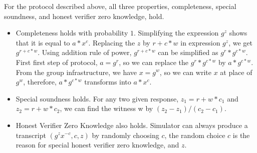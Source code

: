 \begin{enumerate}
{     For the protocol described above, all three properties, completeness, special soundness, and honest 
     verifier zero knowledge, hold. 
     \begin{itemize}
      \item Completeness holds with probability $1$. Simplifying the expression $g^{z}$ shows that 
      it is equal to $a * x^{c}$. Replacing the $z$ by $r + c * w$ in expression  $g^{z}$, we get 
      $g^{r + c * w}$.  Using addition rule of power, $g^{r + c * w}$ can be simplified as 
      $g^{r} * g^{c * w}$. First first step of protocol, $a = g^r$, so we can replace the $g^{r} * g^{c * w}$ 
      by $a * g^{c * w}$. From the group infrastructure, we have $x = g^w$, so we can write $x$ at place of 
      $g^{w}$, therefore, $a * g^{c * w}$ transforms into $a * x^c$. 
      
     \item Special soundness holds. For any two given response, 
     $z_{1} = r + w * c_{1}$ and  $z_{2} = r + w * c_{2}$, we can find the witness w by  $(z_{2} - z_{1})/(c_{2} - c_{1})$.
     
     \item Honest Verifier Zero Knowledge also holds. Simulator can always produce a transcript $(g^{z} x^{-c}, c, z)$ by randomly 
     choosing $c$, the random choice $c$ is the reason for special honest verifier zero knowledge, and $z$.
     \end{itemize}
     
   
}
\end{enumerate}
